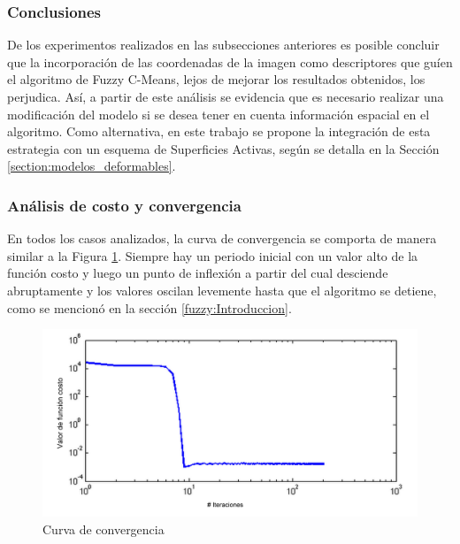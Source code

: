 \subsubsection{Conclusiones}
De los experimentos realizados en las subsecciones anteriores es posible concluir que la incorporación de las coordenadas de la imagen como descriptores que guíen el algoritmo de Fuzzy C-Means, lejos de mejorar los resultados obtenidos, los perjudica. Así, a partir de este análisis se evidencia que es necesario realizar una modificación del modelo si se desea tener en cuenta información espacial en el algoritmo. Como alternativa, en este trabajo se propone la integración de esta estrategia con un esquema de Superficies Activas, según se detalla en la Sección \ref{section:modelos_deformables}.

\subsubsection{Análisis de costo y convergencia}
En todos los casos analizados, la curva de convergencia se comporta de manera similar a la Figura \ref{fig:convergencia}. Siempre hay un periodo inicial con un valor alto de la función costo y luego un punto de inflexión a partir del cual desciende abruptamente y los valores oscilan levemente hasta que el algoritmo se detiene, como se mencionó en la sección \ref{fuzzy:Introduccion}.

\begin{figure}[H]
\centering
\includegraphics[scale=0.07]{images/grafico_costo_con_carteles.jpg}
\caption{Curva de convergencia}
\label{fig:convergencia}
\end{figure}


